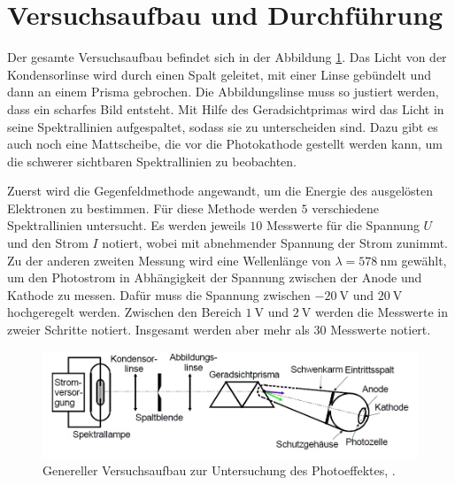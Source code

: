 \section{Versuchsaufbau und Durchführung}
\label{sec:Durchführung}
Der gesamte Versuchsaufbau befindet sich in der Abbildung \ref{fig:optischeraufbau}. Das Licht von der Kondensorlinse wird durch einen Spalt geleitet, mit einer Linse gebündelt und dann an einem Prisma gebrochen. 
Die Abbildungslinse muss so justiert werden, dass ein scharfes Bild entsteht. Mit Hilfe des Geradsichtprimas wird das Licht in seine Spektrallinien aufgespaltet, sodass sie zu unterscheiden sind. 
Dazu gibt es auch noch eine Mattscheibe, die vor die Photokathode gestellt werden kann, um die schwerer sichtbaren Spektrallinien zu beobachten. 

Zuerst wird die Gegenfeldmethode angewandt, um die Energie des ausgelösten Elektronen zu bestimmen. Für diese Methode werden $5$ verschiedene Spektrallinien untersucht. Es werden jeweils $10$ Messwerte für die 
Spannung $U$ und den Strom $I$ notiert, wobei mit abnehmender Spannung der Strom zunimmt.
Zu der anderen zweiten Messung wird eine Wellenlänge von $\lambda = \SI{578}{\nano\meter}$ gewählt, um den Photostrom in Abhängigkeit der Spannung zwischen der Anode und Kathode zu messen. Dafür muss die 
Spannung zwischen $\SI{-20}{\volt}$ und $\SI{+20}{\volt}$ hochgeregelt werden. Zwischen den Bereich $\SI{1}{\volt}$ und $\SI{2}{\volt}$ werden die Messwerte in zweier Schritte notiert. Insgesamt werden aber mehr als 30 Messwerte notiert.
\begin{figure}[h!]
	\centering
	\includegraphics[width=0.9\linewidth]{OptischerAufbau.jpg}
	\caption{Genereller Versuchsaufbau zur Untersuchung des Photoeffektes, \cite[4]{anleitung500}.}
	\label{fig:optischeraufbau}
\end{figure}
